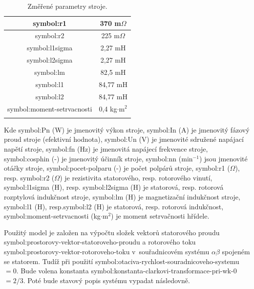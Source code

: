 \documentclass[a4paper, twoside, 11pt]{article}
\begin{document}
        \begin{minipage}[t]{0.47\textwidth}
            \vspace{0pt}
            \begin{table}[H]
                \caption{Změřené parametry stroje.}
                \centering
                    \begin{tabular}{!{\vrule width 2pt} c | c !{\vrule width 2pt}}
                        \gls{symbol:r1} & 370 m$\Omega$ \\ \hline
                        \gls{symbol:r2} & 225 m$\Omega$ \\ \hline
                        \gls{symbol:l1sigma} & 2,27 mH \\ \hline
                        \gls{symbol:l2sigma} & 2,27 mH \\ \hline
                        \gls{symbol:lm} & 82,5 mH \\ \hline
                        \gls{symbol:l1} & 84,77 mH \\ \hline
                        \gls{symbol:l2} & 84,77 mH \\ \hline
						\gls{symbol:moment-setrvacnosti} & 0,4 kg$\cdot$m$^{2}$ \\ 
                    \end{tabular}     
                \label{tab:motor-zmerene-parametry-stroje}
            \end{table}
        \end{minipage}

        \vspace*{1cm}
Kde \gls{symbol:Pn} (W) je jmenovitý výkon stroje, \gls{symbol:In} (A) je jmenovitý fázový proud stroje (efektivní hodnota), \gls{symbol:Un} (V) je jmenovité sdružené napájací napětí stroje, \gls{symbol:fn} (Hz) je jmenovitá napájecí frekvence stroje, \gls{symbol:cosphin} (-) je jmenovitý účinník stroje, \gls{symbol:nn} (min$^{-1}$) jsou jmenovité otáčky stroje, \gls{symbol:pocet-polparu} (-) je počet polpárů stroje, \gls{symbol:r1} ($\Omega$), resp. \gls{symbol:r2} ($\Omega$) je rezistivita statorového, resp. rotorového vinutí, \gls{symbol:l1sigma} (H), resp. \gls{symbol:l2sigma} (H) je statorová, resp. rotorová rozptylová  indukčnost stroje, \gls{symbol:lm} (H) je magnetizační indukčnost stroje, \gls{symbol:l1} (H), resp.\gls{symbol:l2} (H) je statorová, resp. rotorová indukčnost, \gls{symbol:moment-setrvacnosti} (kg$\cdot$m$^{2}$) je moment setrvačnosti hřídele.\par
Použitý model je založen na výpočtu složek vektorů statorového proudu \gls{symbol:prostorovy-vektor-statoroveho-proudu} a rotorového toku \gls{symbol:prostorovy-vektor-rotoroveho-toku} v~souřadnicovém systému $\alpha\beta$ spojeném se statorem. Tudíž při použití \gls{symbol:otaciva-rychlost-souradnicoveho-systemu}~$= 0$. Bude volena konstanta \gls{symbol:konstanta-clarkovi-transformace-pri-wk-0}~$= 2/3$. Poté bude stavový popis systému vypadat následovně.
\end{document}
